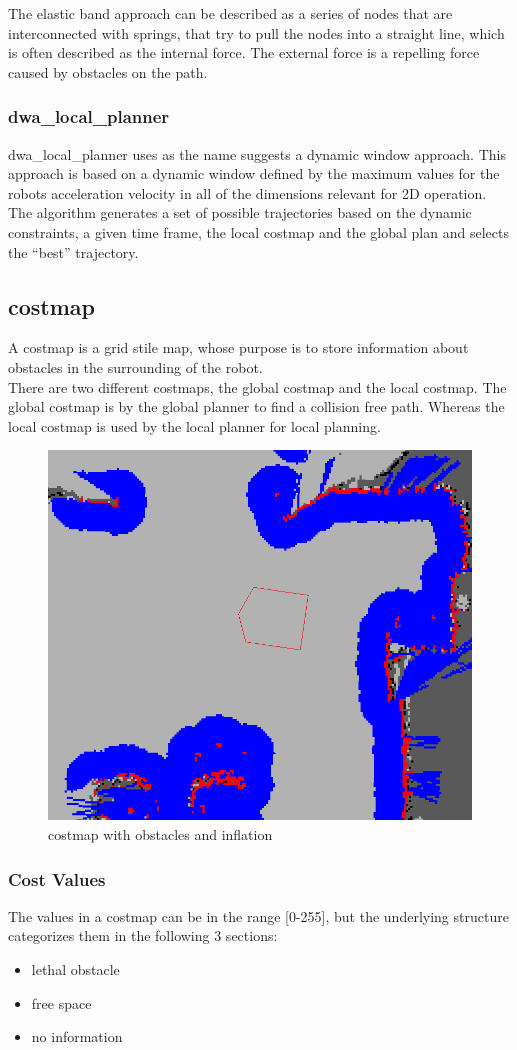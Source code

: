The elastic band approach can be described as a series of nodes that are interconnected with springs, that try to pull the nodes into a straight line, which is often described as the internal force. The external force is a repelling force caused by obstacles on the path\cite{elasticband}.

\subsubsection{dwa\_local\_planner}
dwa\_local\_planner uses as the name suggests a dynamic window approach. This approach is based on a dynamic window defined by the maximum values for the robots acceleration velocity in all of the dimensions relevant for 2D operation.\\
The algorithm generates a set of possible trajectories based on the dynamic constraints, a given time frame, the local costmap and the global plan and selects the ``best'' trajectory\cite{dwa}.

\subsection{costmap}
A costmap is a grid stile map, whose purpose is to store information about obstacles in the surrounding of the robot.\\
There are two different costmaps, the global costmap and the local costmap.
The global costmap is by the global planner to find a collision free path. Whereas the local costmap is used by the local planner for local planning.\cite{navsetup}\\

\begin{figure}[H]
	\includegraphics[width=.5\textwidth]{Pictures/costmap_rviz}
	\caption{costmap with obstacles and inflation \cite{costmap}}
	\label{costmap}
\end{figure}


\subsubsection{Cost Values}
The values in a costmap can be in the range [0-255], but the underlying structure categorizes them in the following 3 sections:
\begin{itemize}
	\item lethal obstacle
	\item free space
	\item no information
\end{itemize}

